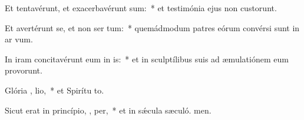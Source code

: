 \item Et tentavérunt, et exacerbavérunt  sum:~* et testimónia ejus non custorunt.
\item Et avertérunt se, et non ser tum:~* quemádmodum patres eórum convérsi sunt in ar vum.
\item In iram concitavérunt eum in  is:~* et in sculptílibus suis ad æmulatiónem eum provorunt.
\item Glória ,  lio,~* et Spirítu to.
\item Sicut erat in princípio,  ,  per,~* et in sǽcula sæculó. men.
